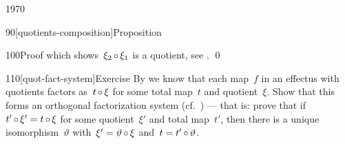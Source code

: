 \begin{parsec}{1970}
\begin{point}{90}[quotients-composition]{Proposition}
\begin{point}{100}{Proof}
which shows~$\xi_2 \mathop{\circ} \xi_1$ is a quotient, see . \qed
\end{point}
\end{point}
\begin{point}{110}[quot-fact-system]{Exercise}
By  we know that each
    map~$f$ in an effectus with quotients factors as~$t \mathop{\circ} \xi$
    for some total map~$t$ and quotient~$\xi$.
Show that this forms an orthogonal factorization system (cf.~\cite{korostenski1993factorization}) ---
    that is: prove that if~$t' \mathop{\circ} \xi' = t \mathop{\circ} \xi$
    for some quotient~$\xi'$ and total map~$t'$,
    then there is a unique isomorphism~$\vartheta$
    with~$\xi' = \vartheta \mathop{\circ} \xi$
    and~$t = t' \mathop{\circ} \vartheta$.
\end{point}
\end{parsec}


